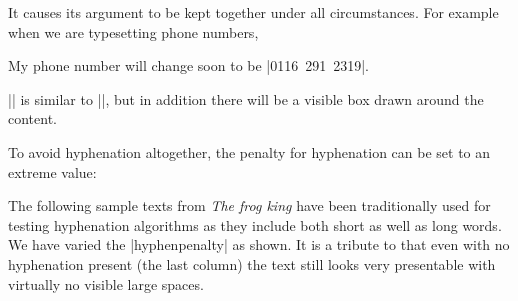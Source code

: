 {{{It causes its argument to be kept together under all circumstances. 
For example when we are typesetting phone numbers,

\begin{teX}
My phone number will change soon to be |\mbox{0116 291 2319}|.
\end{teX}

\noindent |\fbox| is similar to |\mbox|, but in addition there will be a visible box drawn around the content.

To avoid hyphenation altogether, the penalty for hyphenation can be set to an extreme value:

\begin{teX}
\end{teX}

The following sample texts from \textit{The frog king}\cite{frogking} have been traditionally used for testing hyphenation algorithms as they
include both short as well as long words. We have varied the |hyphenpenalty| as shown. It is a tribute to \tex that even with no hyphenation present (the last column) the text still looks very presentable with virtually no visible large spaces.

\long{}

\overfullrule=0.1pt
\begin{fullwidth}
\begin{minipage}{1.9in}
 \sampletext
\end{minipage}\hspace{.8cm}
\begin{minipage}{1.9in}
 \sampletext
\end{minipage}\hspace{.8cm}
\begin{minipage}{1.9in}
  \sampletext
\end{minipage}
\end{fullwidth}

}}}
